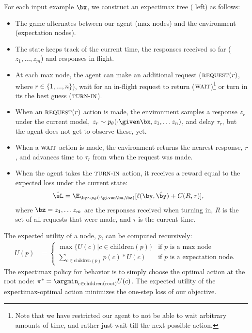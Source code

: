 For each input example $\bx$, we construct an expectimax tree ( left) as follows: 
\begin{itemize}
  \item The game alternates between our agent (max nodes) and the environment (expectation nodes).
  \item The state keeps track of the current time, the responses received so far ($z_1, \ldots, z_m$) and responses in flight.
  \item At each max node, the agent can make an additional request ($\operatorname{\textsc{request}}(r)$, where $r \in \{1, \ldots, n\}$), wait for an in-flight request to return ($\operatorname{\textsc{wait}}$)\footnote{Note that we have restricted our agent to not be able to wait arbitrary amounts of time, and rather just wait till the next possible action.} or turn in its the best guess ($\operatorname{\textsc{turn-in}}$).
  \item When an $\operatorname{\textsc{request}}(r)$ action is made, the environment samples a response $z_r$ under the current model, $z_r \sim \p(\cdot \given \bx, z_1, \dots z_n)$, and delay $\tau_r$, but the agent does not get to observe these, yet.
  \item When a $\operatorname{\textsc{wait}}$ action is made, the environment returns the nearest response, $r$, and advances time to $\tau_r$ from when the request was made.
  \item When the agent takes the $\operatorname{\textsc{turn-in}}$ action, it receives a reward equal to the expected loss under the current state:
      \begin{align*}
        \hat\sL &= \E_{\by \sim \p(\cdot \given \bx, \bz)}[\ell(\by, \byt) + C(R, \tau)],
      \end{align*}
  where $\bz = z_1, \dots z_m$ are the responses received when turning in, $R$ is the set of all requests that were made, and $\tau$ is the current time.
\end{itemize}

The expected utility of a node, $p$, can be computed recursively:
\begin{align*}
  U(p) &= 
  \begin{cases}
    \max\{ U(c) | c \in \textrm{children}(p) \} & \textrm{if $p$ is a max node} \\
    \sum_{c \in \textrm{children}(p)} p(c) * U(c) & \textrm{if $p$ is a expectation node}.
  \end{cases}
\end{align*}
The expectimax policy for behavior is to simply choose the optimal action at the root node: $\pi^* = \argmin_{c \in \textrm{children}(\textrm{root})} U(c)$.
The expected utility of the expectimax-optimal action minimizes the one-step loss of our objective.

